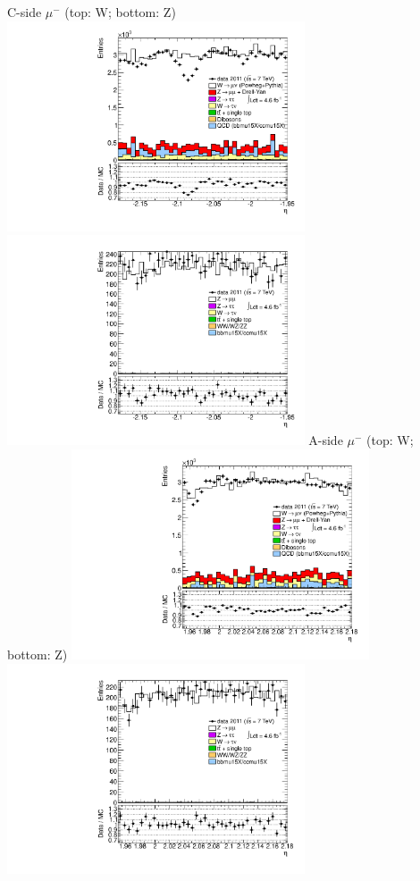  {
\colb[T]
C-side $\mu^{-}$ (top: W; bottom: Z)
\centering
\includegraphics[width=0.66\textwidth]{dates/20130306/figures/both/Wpt2535_10_C_stack_l_eta_NEG} \\
\includegraphics[width=0.66\textwidth]{dates/20130306/figures/both/Zpt2535_10_C_stack_lN_eta_ALL.pdf}
A-side $\mu^{-}$ (top: W; bottom: Z)
\centering
\includegraphics[width=0.66\textwidth]{dates/20130306/figures/both/Wpt2535_10_A_stack_l_eta_NEG} \\
\includegraphics[width=0.66\textwidth]{dates/20130306/figures/both/Zpt2535_10_A_stack_lN_eta_ALL.pdf} 
\cole
}

